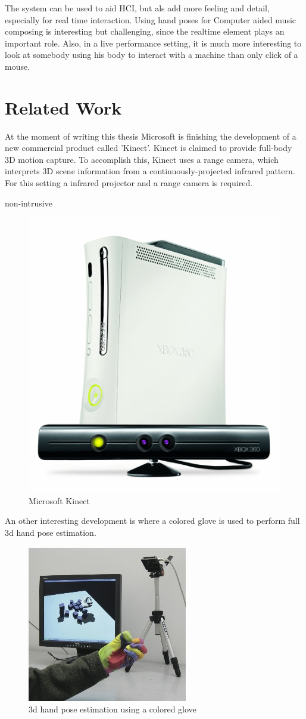 The system can be used to aid HCI, but als add more feeling and detail, especially for real time interaction. Using hand poses for Computer aided music composing is interesting but challenging, since the realtime element plays an important role. Also, in a live performance setting, it is much more interesting to look at somebody using his body to interact with a machine than only click of a mouse.



\section{Related Work}
At the moment of writing this thesis Microsoft is finishing the development of a new commercial product called 'Kinect'. Kinect is claimed to provide full-body 3D motion capture. To accomplish this, Kinect uses a range camera, which interprets 3D scene information from a continuously-projected infrared pattern. For this setting a infrared projector and a range camera is required.

non-intrusive

\begin{figure}[htbp]
	\center{}
	\label{fig:kinect}
	\includegraphics[width=0.3\linewidth]{figures/wave.jpg}
	\caption{Microsoft Kinect}
\end{figure}


An other interesting development is \cite{Wang2009} where a colored glove is used to perform full 3d hand pose estimation.

\begin{figure}[htbp]
	\center{}
	\label{fig:wang2009}
	\includegraphics[width=0.3\linewidth]{figures/wang2009.jpg}
	\caption{3d hand pose estimation using a colored glove}
\end{figure}

